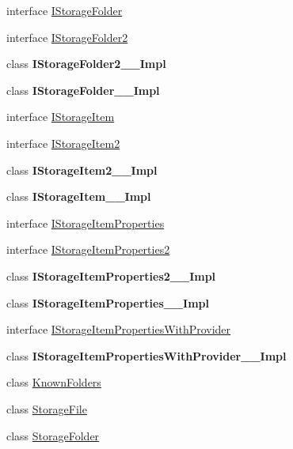 \begin{DoxyCompactItemize}
\item 
interface \hyperlink{interface_windows_1_1_storage_1_1_i_storage_folder}{I\+Storage\+Folder}
\item 
interface \hyperlink{interface_windows_1_1_storage_1_1_i_storage_folder2}{I\+Storage\+Folder2}
\item 
class {\bfseries I\+Storage\+Folder2\+\_\+\+\_\+\+Impl}
\item 
class {\bfseries I\+Storage\+Folder\+\_\+\+\_\+\+Impl}
\item 
interface \hyperlink{interface_windows_1_1_storage_1_1_i_storage_item}{I\+Storage\+Item}
\item 
interface \hyperlink{interface_windows_1_1_storage_1_1_i_storage_item2}{I\+Storage\+Item2}
\item 
class {\bfseries I\+Storage\+Item2\+\_\+\+\_\+\+Impl}
\item 
class {\bfseries I\+Storage\+Item\+\_\+\+\_\+\+Impl}
\item 
interface \hyperlink{interface_windows_1_1_storage_1_1_i_storage_item_properties}{I\+Storage\+Item\+Properties}
\item 
interface \hyperlink{interface_windows_1_1_storage_1_1_i_storage_item_properties2}{I\+Storage\+Item\+Properties2}
\item 
class {\bfseries I\+Storage\+Item\+Properties2\+\_\+\+\_\+\+Impl}
\item 
class {\bfseries I\+Storage\+Item\+Properties\+\_\+\+\_\+\+Impl}
\item 
interface \hyperlink{interface_windows_1_1_storage_1_1_i_storage_item_properties_with_provider}{I\+Storage\+Item\+Properties\+With\+Provider}
\item 
class {\bfseries I\+Storage\+Item\+Properties\+With\+Provider\+\_\+\+\_\+\+Impl}
\item 
class \hyperlink{class_windows_1_1_storage_1_1_known_folders}{Known\+Folders}
\item 
class \hyperlink{class_windows_1_1_storage_1_1_storage_file}{Storage\+File}
\item 
class \hyperlink{class_windows_1_1_storage_1_1_storage_folder}{Storage\+Folder}
\end{DoxyCompactItemize}
